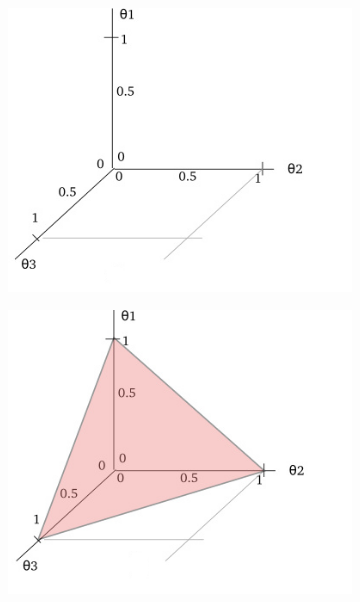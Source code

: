 \begin{figure}
    \centering

    \begin{subfigure}{.45\textwidth}
        \centering
        \includegraphics[width=\linewidth]{assets/4/simplex_1.png}
        \caption{}
        \label{fig:4_simplex_1}
    \end{subfigure}%
    \begin{subfigure}{.45\textwidth}
        \centering
        \includegraphics[width=\linewidth]{assets/4/simplex_2.png}
        \caption{}
        \label{fig:4_simplex_2}
    \end{subfigure}


\end{figure}
